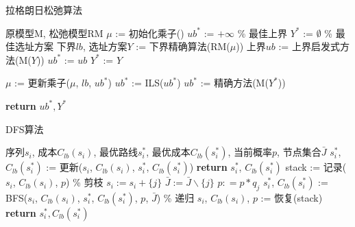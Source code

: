 \documentclass[11pt]{article}
\begin{document}
\begin{CJK*}{UTF8}{gkai}

\begin{algorithm}
\caption{拉格朗日松弛算法}
    \begin{algorithmic}[1] %
        \Require 原模型M, 松弛模型RM
        \State $\mu$ := 初始化乘子()
        \State $ub^*$ := $+\infty$  \quad \% 最佳上界
        \State $Y^*$ := $\emptyset$ \quad \% 最佳选址方案
        \Repeat
            \State 下界$lb$, 选址方案$Y$ := 下界精确算法(RM($\mu$))
            \State 上界$ub$ := 上界启发式方法(M($Y$))
                \State $ub^*$ := $ub$
                \State $Y^*$ := $Y$
            \EndIf
            
            \State $\mu$ := 更新乘子($\mu$, $lb$, $ub^*$)
                \State $ub^*$ := ILS($ub^*$)
            \EndIf
        \State $ub^*$ := 精确方法(M($Y^*$))
        
        \State \textbf{return} $ub^*, Y^*$
    \end{algorithmic}
\end{algorithm}



\begin{algorithm}
    \caption{DFS算法}
        \begin{algorithmic}[1] %
            \Require 序列$s_i$, 成本$C_{lb}(s_i)$, 最优路线$s_i^*$, 最优成本$C_{lb}(s_i^*)$, 当前概率$p$, 节点集合$\bar{J}$
                \State $s_i^*$, $C_{lb}(s_i^*)$ := 更新($s_i$, $C_{lb}(s_i)$, $s_i^*$, $C_{lb}(s_i^*)$)
                \State \textbf{return} $s_i^*$, $C_{lb}(s_i^*)$
            \Else
                    \State stack := 记录($s_i$, $C_{lb}(s_i)$, $p$)
                     \% 剪枝
                        \State $s_i:=s_i + \{j\}$
                        \State $\bar{J} :=\bar{J} \backslash \{j\}$
                        \State $p: = p * q_j$
                        \State $s_i^*$, $C_{lb}(s_i^*)$ := BFS($s_i$, $C_{lb}(s_i)$, $s_i^*$, $C_{lb}(s_i^*)$, $p$, $\bar{J}$) \quad \% 递归
                        \State $s_i$, $C_{lb}(s_i)$, $p$ := 恢复(stack)
                    \EndIf  
                \EndFor
            \EndIf
            \State \textbf{return} $s_i^*, C_{lb}(s_i^*)$
        \end{algorithmic}
    \end{algorithm}



\end{CJK*}
\end{document}
